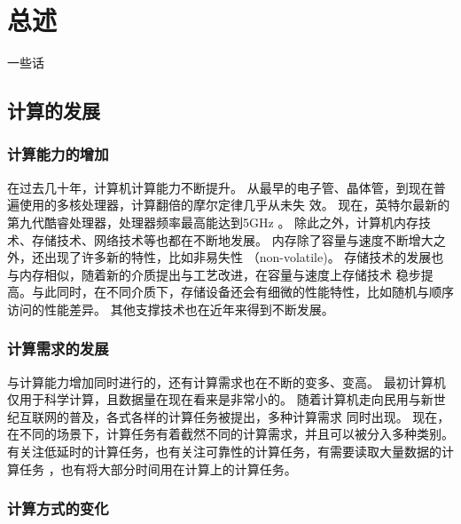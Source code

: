 \chapter{总述} %

\label{Chapter1} %

一些话


\section{计算的发展}

\subsection{计算能力的增加}

在过去几十年，计算机计算能力不断提升。
从最早的电子管、晶体管，到现在普遍使用的多核处理器，计算翻倍的摩尔定律几乎从未失
效。
现在，英特尔最新的第九代酷睿处理器，处理器频率最高能达到5GHz
\cite{intel2018corei9}。
除此之外，计算机内存技术、存储技术、网络技术等也都在不断地发展。
内存除了容量与速度不断增大之外，还出现了许多新的特性，比如非易失性
（non-volatile)\cite{wikipedia2019nvm}。
存储技术的发展也与内存相似，随着新的介质提出与工艺改进，在容量与速度上存储技术
稳步提高。与此同时，在不同介质下，存储设备还会有细微的性能特性，比如随机与顺序
访问的性能差异。
其他支撑技术也在近年来得到不断发展。

\subsection{计算需求的发展}

与计算能力增加同时进行的，还有计算需求也在不断的变多、变高。
最初计算机仅用于科学计算，且数据量在现在看来是非常小的。
随着计算机走向民用与新世纪互联网的普及，各式各样的计算任务被提出，多种计算需求
同时出现。
现在，在不同的场景下，计算任务有着截然不同的计算需求，并且可以被分入多种类别。
有关注低延时的计算任务，也有关注可靠性的计算任务，有需要读取大量数据的计算任务
，也有将大部分时间用在计算上的计算任务。

\subsection{计算方式的变化}

